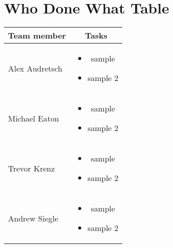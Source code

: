 \documentclass{article}
\begin{document}
\section{Who Done What Table}
\begin{center}
\begin{tabular}{|l|c|}
\hline
Team member & Tasks \\ \hline
Alex Audretsch & 
\begin{minipage}{.4\textwidth}
\vspace{11pt}
\begin{itemize}
	\item sample
	\item sample 2
\end{itemize} 
\end{minipage} \\ \hline
Michael Eaton & 
\begin{minipage}{.4\textwidth}
\vspace{11pt}
\begin{itemize}
	\item sample
	\item sample 2
\end{itemize} 
\end{minipage} \\ \hline
Trevor Krenz & 
\begin{minipage}{.4\textwidth}
\vspace{11pt}
\begin{itemize}
	\item sample
	\item sample 2
\end{itemize} 
\end{minipage} \\ \hline
Andrew Siegle & 
\begin{minipage}{.4\textwidth}
\vspace{11pt}
\begin{itemize}
	\item sample
	\item sample 2
\end{itemize} 
\end{minipage} \\ \hline
\end{tabular}
\end{center}
\end{document}
